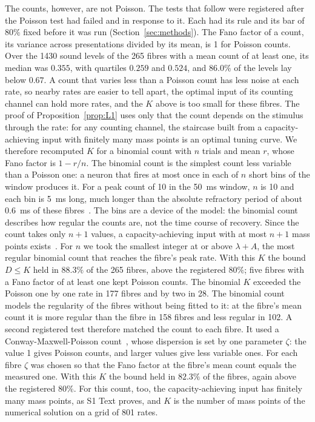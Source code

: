\documentclass[10pt,letterpaper]{article}
\begin{document}
The counts, however, are not Poisson. The tests that follow were registered after the Poisson test had failed and in response to
it. Each had its rule and its bar of $80\%$ fixed before it was run (Section~\ref{sec:methods}). The Fano factor of a count, its variance across presentations divided by its mean, is 1 for
Poisson counts. Over the 1430 sound levels of the 265 fibres with a mean count of at least one, its median was $0.355$, with
quartiles $0.259$ and $0.524$, and $86.0\%$ of the levels lay below $0.67$. A count that varies less than a Poisson count has less
noise at each rate, so nearby rates are easier to tell apart, the optimal input of its counting channel can hold more rates, and the
$K$ above is too small for these fibres. The proof of Proposition~\ref{prop:L1} uses only that the count depends on the stimulus through the rate: for any counting
channel, the staircase built from a capacity-achieving input with finitely many mass points is an optimal tuning curve. We therefore
recomputed $K$ for a binomial count with $n$ trials and mean $r$, whose Fano factor is $1-r/n$. The binomial count is the simplest
count less variable than a Poisson one: a neuron that fires at most once in each of $n$ short bins of the window produces it. For a peak count of 10 in the 50~ms window,
$n$ is 10 and each bin is 5~ms long, much longer than the absolute refractory period of about 0.6~ms of these fibres~\cite{Heeringa2024}.
The bins are a device of the model: the binomial count describes how regular the counts are, not the time course of recovery. Since the count takes only $n+1$
values, a capacity-achieving input with at most $n+1$ mass points exists~\cite{Favano2026}. For $n$ we took the smallest integer at
or above $\lambda+A$, the most regular binomial count that reaches the fibre's peak rate. With this $K$ the bound $D\le K$ held in
$88.3\%$ of the 265 fibres, above the registered $80\%$; five fibres with a Fano factor of at least one kept Poisson counts. The binomial $K$
exceeded the Poisson one by one rate in 177 fibres and by two in 28. The binomial count models the regularity of the fibres without
being fitted to it: at the fibre's mean count it is more regular than the fibre in 158 fibres and less regular in 102. A second
registered test therefore matched the count to each fibre. It used a Conway-Maxwell-Poisson count~\cite{Shmueli2005}, whose dispersion is set by one
parameter $\zeta$: the value 1 gives Poisson counts, and larger values give less variable ones. For each fibre $\zeta$ was chosen so
that the Fano factor at the fibre's mean count equals the measured one. With this $K$ the bound held in $82.3\%$ of the fibres, again
above the registered $80\%$. For this count, too, the capacity-achieving input has finitely many mass points, as S1 Text proves, and
$K$ is the number of mass points of the numerical solution on a grid of 801 rates.
\end{document}
